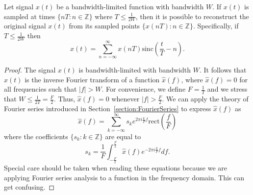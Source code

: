 \begin{theorem} \label{theorem:SamplingTheorem}
Let signal $x(t)$ be a bandwidth-limited function with bandwidth $W$.
If $x(t)$ is sampled at times $\{ nT : n \in \mathbb{Z} \}$ where $T \leq \frac{1}{2W}$, then it is possible to reconstruct the original signal $x(t)$ from its sampled points $\{ x(nT) : n \in \mathbb{Z} \}$.
Specifically, if $T \leq \frac{1}{2W}$ then
\begin{equation} \label{equation:SamplingReconstructionFormula}
x(t) = \sum_{n = -\infty}^{\infty}
x(nT) \mathrm{sinc} \left( \frac{t}{T}-n \right) .
\end{equation}
\end{theorem}
\begin{proof}
The signal $x(t)$ is bandwidth-limited with bandwidth $W$.
It follows that $x(t)$ is the inverse Fourier transform of a function $\hat{x}(f)$, where $\hat{x}(f) = 0$ for all frequencies such that $|f| > W$.
For convenience, we define $F = \frac{1}{T}$ and we stress that $W \leq \frac{1}{2T} = \frac{F}{2}$.
Thus, $\hat{x}(f) = 0$ whenever $|f| > \frac{F}{2}$.
We can apply the theory of Fourier series introduced in Section~\ref{section:FourierSeries} to express $\hat{x}(f)$ as
\begin{equation*}
\hat{x}(f) = \sum_{k=-\infty}^{\infty} s_k e^{2 \pi i \frac{k}{F} f}
\mathrm{rect} \left( \frac{f}{F} \right)
\end{equation*}
where the coefficients $\{ s_k : k \in \mathbb{Z} \}$ are equal to
\begin{equation*}
s_k
= \frac{1}{F} \int_{-\frac{F}{2}}^{\frac{F}{2}}
\hat{x}(f) e^{- 2 \pi i \frac{k}{F} f} df .
\end{equation*}
Special care should be taken when reading these equations because we are applying Fourier series analysis to a function in the frequency domain.
This can get confusing.


\end{proof}
